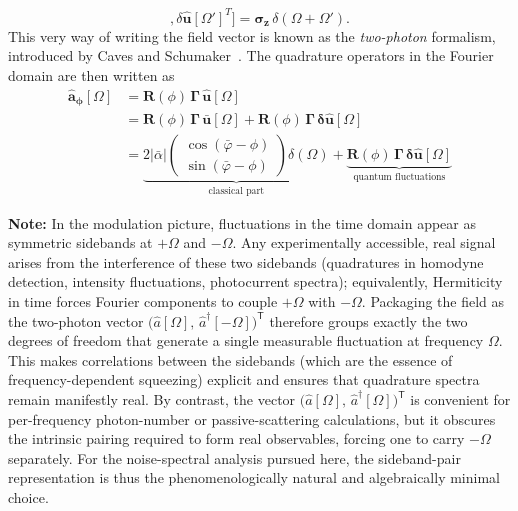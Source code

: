 \begin{equation}
  [\delta \mathbf{\hat{u}}[\Omega], \delta \mathbf{\hat{u}}[\Omega']^{T}] = \mathbf{\sigma_z} \, \delta(\Omega + \Omega').
\end{equation}
This very way of writing the field vector is known as the \textit{two-photon} formalism, introduced by Caves and Schumaker~\cite{Caves1985,Caves1985a}. The quadrature operators in the Fourier domain are then written as 
\begin{equation}
  \begin{split}
      \mathbf{\hat{a}_\phi}[\Omega] &= \mathbf{R}(\phi) \, \mathbf{\Gamma} \, \mathbf{\hat{u}}[\Omega]\\
      & = \mathbf{R}(\phi) \, \mathbf{\Gamma} \,\mathbf{\bar{u}}[\Omega] + \mathbf{R}(\phi) \, \mathbf{\Gamma} \, \mathbf{\delta \hat{u}}[\Omega] \\
      & = \underbrace{2|\bar{\alpha}| \begin{pmatrix}
  \cos(\bar{\varphi}-\phi) \\[2pt]
  \sin(\bar{\varphi}-\phi)
\end{pmatrix} \delta(\Omega)}_{\text{classical part}} +
\underbrace{\mathbf{R}(\phi) \, \mathbf{\Gamma} \, \mathbf{\delta \hat{u}}[\Omega]}_{\text{quantum fluctuations}}
  \end{split}
\end{equation}


\noindent\textbf{Note: }
In the modulation picture, fluctuations in the time domain appear as symmetric sidebands at \(+\Omega\) and \(-\Omega\).
Any experimentally accessible, real signal arises from the interference of these two sidebands (quadratures in homodyne detection, intensity fluctuations, photocurrent spectra); equivalently, Hermiticity in time forces Fourier components to couple \(+\Omega\) with \(-\Omega\).
Packaging the field as the two-photon vector \(\big(\hat a[\Omega],\,\hat a^\dagger[-\Omega]\big)^{\mathsf T}\) therefore groups exactly the two degrees of freedom that generate a single measurable fluctuation at frequency \(\Omega\). This makes correlations between the sidebands (which are the essence of frequency-dependent squeezing) explicit and ensures that quadrature spectra remain manifestly real. By contrast, the vector \(\big(\hat a[\Omega],\,\hat a^\dagger[\Omega]\big)^{\mathsf T}\) is convenient for per-frequency photon-number or passive-scattering calculations, but it obscures the intrinsic pairing required to form real observables, forcing one to carry \(-\Omega\) separately.
For the noise-spectral analysis pursued here, the sideband-pair representation is thus the phenomenologically natural and algebraically minimal choice.



